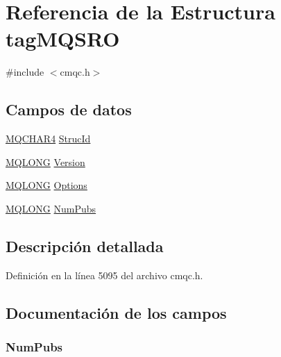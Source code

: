 \hypertarget{structtag_m_q_s_r_o}{}\section{Referencia de la Estructura tag\+M\+Q\+S\+R\+O}
\label{structtag_m_q_s_r_o}


{\ttfamily \#include $<$cmqc.\+h$>$}

\subsection*{Campos de datos}
\begin{DoxyCompactItemize}
\item 
\hyperlink{cmqc_8h_a12590e546ed66fda7cf21c1d5cefa31d}{M\+Q\+C\+H\+A\+R4} \hyperlink{structtag_m_q_s_r_o_a0530922ca944569b52601d74941f96e4}{Struc\+Id}
\item 
\hyperlink{cmqc_8h_a1fb8d28cbda3fa8766a9821230cdb6d5}{M\+Q\+L\+O\+N\+G} \hyperlink{structtag_m_q_s_r_o_a0656ef8f766b3907d394d88a35d7b7e9}{Version}
\item 
\hyperlink{cmqc_8h_a1fb8d28cbda3fa8766a9821230cdb6d5}{M\+Q\+L\+O\+N\+G} \hyperlink{structtag_m_q_s_r_o_ad7aff2d6c6044809464380998d24ec5c}{Options}
\item 
\hyperlink{cmqc_8h_a1fb8d28cbda3fa8766a9821230cdb6d5}{M\+Q\+L\+O\+N\+G} \hyperlink{structtag_m_q_s_r_o_a250881f7ae348b691f4cc3e46b0a2aee}{Num\+Pubs}
\end{DoxyCompactItemize}


\subsection{Descripción detallada}


Definición en la línea 5095 del archivo cmqc.\+h.



\subsection{Documentación de los campos}
\hypertarget{structtag_m_q_s_r_o_a250881f7ae348b691f4cc3e46b0a2aee}{}
\subsubsection[{Num\+Pubs}]{ Num\+Pubs}\label{structtag_m_q_s_r_o_a250881f7ae348b691f4cc3e46b0a2aee}


